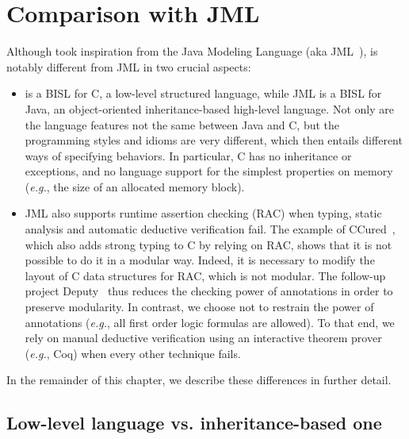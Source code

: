 \section{Comparison with JML}
\label{sec:comp-jml}


Although \acsl took inspiration from the Java Modeling Language (aka
JML~\cite{jmlhomepage}), \acsl is notably different from JML in
two crucial aspects:

\begin{itemize}
\item \acsl is a BISL for C, a low-level structured language, while JML
  is a BISL for Java, an object-oriented inheritance-based high-level
  language. Not only are the language features not the same between Java and C, but the
  programming styles and idioms are very different, which then entails
  different ways of specifying behaviors. In particular, C has no
  inheritance or exceptions, and no language support for the simplest
  properties on memory (\emph{e.g.}, the size of an allocated memory block).
\item JML also supports runtime assertion checking (RAC) when typing,
  static analysis and automatic deductive verification fail. The
  example of CCured~\cite{necula02ccured,condit03ccured}, which also adds
  strong typing to C by relying on RAC, shows that it is not possible
  to do it in a modular way. Indeed, it is necessary to modify the
  layout of C data structures for RAC, which is not modular. The
  follow-up project Deputy~\cite{condit07deputy} thus reduces the
  checking power of annotations in order to preserve modularity.  In contrast, we choose not to restrain the power of annotations
  (\emph{e.g.}, all first order logic formulas are allowed). To that end, we
  rely on manual deductive verification using an interactive theorem
  prover (\emph{e.g.}, Coq) when every other technique fails.
\end{itemize}

\noindent
In the remainder of this chapter, we describe these differences in
further detail.

\subsection{Low-level language vs. inheritance-based one}

